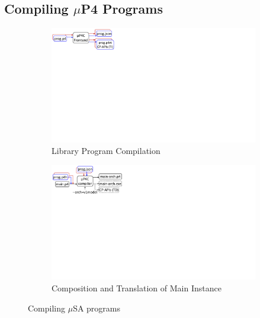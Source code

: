 \documentclass{hotnets19}
\begin{document}
\subsection{Compiling $\mu$P4 Programs}

\begin{figure}[!h]
    \begin{subfigure}{\linewidth}
        \centering
        \includegraphics[trim=0 435 665 0, clip,scale=0.55]{mp4c-frontend}
        \caption{Library Program Compilation}
        \label{subfig:compiling-modules}
    \end{subfigure}
    \begin{subfigure}{\linewidth}
        \centering
        \includegraphics[trim=0 407 628 0, clip,scale=0.55]{mp4c-compiler}
        \caption{Composition and Translation of Main Instance}
        \label{subfig:composition-translation-of-main-instance}
    \end{subfigure}
\caption{Compiling $\mu$SA programs}
\label{fig:compiling-msa-programs}
\end{figure}
\end{document}
